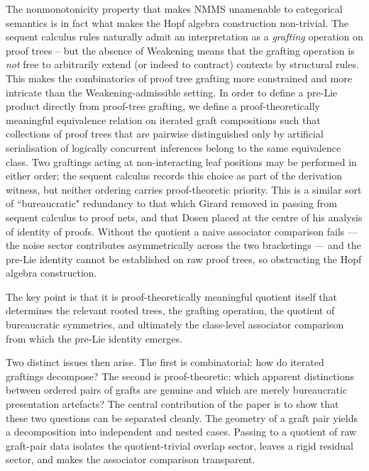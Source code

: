 \documentclass[11pt]{article}
\begin{document}
The nonmonotonicity property that makes NMMS unamenable to categorical semantics is in fact what makes the Hopf algebra construction non-trivial. The sequent calculus rules naturally admit an interpretation as a \emph{grafting} operation on proof trees -- but the absence of Weakening means that the grafting operation is \emph{not} free to arbitrarily extend (or indeed to contract) contexts by structural rules. This makes the combinatorics of proof tree grafting more constrained and more intricate than the Weakening-admissible setting. In order to define a pre-Lie product directly from proof-tree grafting, we define a proof-theoretically meaningful equivalence relation on iterated graft compositions such that collections of proof trees that are pairwise distinguished only by artificial serialisation of logically concurrent inferences belong to the same equivalence class. Two graftings acting at non-interacting leaf positions may be performed in either order; the sequent calculus records this choice as part of the derivation witness, but neither ordering carries proof-theoretic priority. This is a similar sort of ``bureaucratic" redundancy to that which Girard removed in passing from sequent calculus to proof nets, and that Dosen placed at the centre of his analysis of identity of proofs. Without the quotient a naive associator comparison fails — the noise sector contributes asymmetrically across the two bracketings — and the pre-Lie identity cannot be established on raw proof trees, so obstructing the Hopf algebra construction.  

\vspace{0.2cm}

The key point is that it is proof-theoretically meaningful quotient itself that determines the relevant rooted trees, the grafting operation, the quotient of bureaucratic symmetries, and ultimately the class-level associator comparison from which the pre-Lie identity emerges.

Two distinct issues then arise. The first is combinatorial: how do iterated
graftings decompose? The second is proof-theoretic: which apparent
distinctions between ordered pairs of grafts are genuine and which are merely
bureaucratic presentation artefacts? The central contribution of the paper is
to show that these two questions can be separated cleanly. The geometry of
a graft pair yields a decomposition into independent and nested cases.
Passing to a quotient of raw graft-pair data isolates the quotient-trivial
overlap sector, leaves a rigid residual sector, and makes the associator
comparison transparent.
\end{document}
